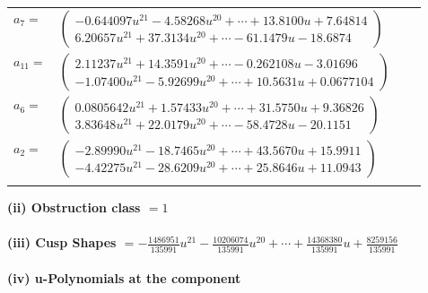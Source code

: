 \documentclass[1p]{elsarticle_modified}
\theoremstyle{definition}
\begin{document}
\begin{tabular}{m{7pt} m{180pt} m{7pt} m{180pt} }
\flushright $a_{7}=$&$\begin{pmatrix}-0.644097 u^{21}-4.58268 u^{20}+\cdots+13.8100 u+7.64814\\6.20657 u^{21}+37.3134 u^{20}+\cdots-61.1479 u-18.6874\end{pmatrix}$ \\
\flushright $a_{11}=$&$\begin{pmatrix}2.11237 u^{21}+14.3591 u^{20}+\cdots-0.262108 u-3.01696\\-1.07400 u^{21}-5.92699 u^{20}+\cdots+10.5631 u+0.0677104\end{pmatrix}$ \\
\flushright $a_{6}=$&$\begin{pmatrix}0.0805642 u^{21}+1.57433 u^{20}+\cdots+31.5750 u+9.36826\\3.83648 u^{21}+22.0179 u^{20}+\cdots-58.4728 u-20.1151\end{pmatrix}$ \\
\flushright $a_{2}=$&$\begin{pmatrix}-2.89990 u^{21}-18.7465 u^{20}+\cdots+43.5670 u+15.9911\\-4.42275 u^{21}-28.6209 u^{20}+\cdots+25.8646 u+11.0943\end{pmatrix}$\\&\end{tabular}
\flushleft \textbf{(ii) Obstruction class $= 1$}\\~\\
\flushleft \textbf{(iii) Cusp Shapes $= -\frac{1486951}{135991} u^{21}-\frac{10206074}{135991} u^{20}+\cdots+\frac{14368380}{135991} u+\frac{8259156}{135991}$}\\~\\
\newpage\renewcommand{\arraystretch}{1}
\flushleft \textbf{(iv) u-Polynomials at the component}\newline \\
\end{document}
